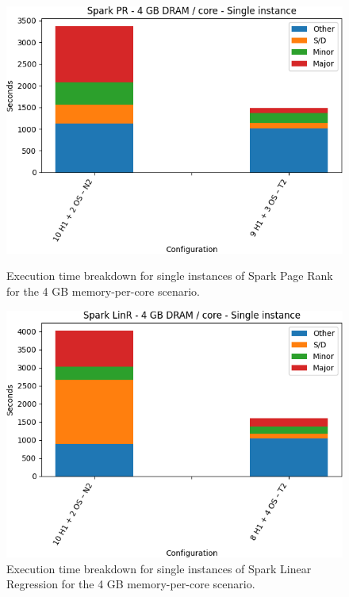 \begin{figure}[thbp]
\centering
    \includegraphics[width=\linewidth]{./fig/pr32_single.png}
    \caption{ Execution time breakdown for single instances of Spark
        Page Rank for the 4 GB memory-per-core scenario.}
    \label{fig:pr32_single}
        \includegraphics[width=\linewidth]{./fig/linr32_single.png}
    \caption{Execution time breakdown for single instances of Spark
        Linear Regression for the 4 GB memory-per-core scenario.}
    \label{fig:linr32_single}
\end{figure}

